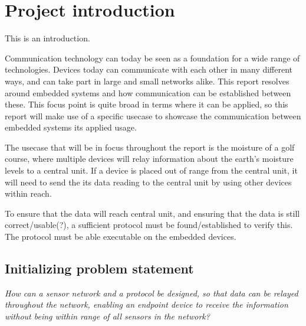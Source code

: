 \chapter{Project introduction}
This is an introduction.


Communication technology can today be seen as a foundation for a wide range of technologies. Devices today can communicate with each other in many different ways, and can take part in large and small networks alike.
%
This report resolves around embedded systems and how communication can be established between these. This focus point is quite broad in terms where it can be applied, so this report will make use of a specific usecase to showcase the communication between embedded systems its applied usage.

The usecase that will be in focus throughout the report is the moisture of a golf course, where multiple devices will relay information about the earth's moisture levels to a central unit. If a device is placed out of range from the central unit, it will need to send the its data reading to the central unit by using other devices within reach.

To ensure that the data will reach central unit, and ensuring that the data is still correct/usable(?), a sufficient protocol must be found/established to verify this. The protocol must be able executable on the embedded devices.




\section{Initializing problem statement}


\textit{How can a sensor network and a protocol be designed, so that data can be relayed throughout the network, enabling an endpoint device to receive the information without being within range of all sensors in the network?}
